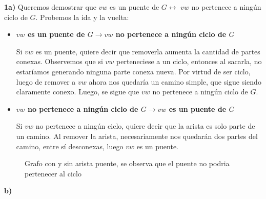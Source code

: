 \documentclass{article}
\begin{document}
\textbf{1a)} Queremos demostrar que $vw$ es un puente de $G \leftrightarrow$ $vw$ no pertenece a ningún ciclo de $G$. Probemos la ida y la vuelta:
\begin{itemize}


\item \textbf{ $vw$ es un puente de $G \rightarrow vw$ no pertenece a ningún ciclo de $G$}

Si $vw$ es un puente, quiere decir que removerla aumenta la cantidad de partes conexas. Observemos que si $vw$ perteneciese a un ciclo, entonces al sacarla, no estaríamos generando ninguna parte conexa nueva. Por virtud de ser ciclo, luego de remover a $vw$ ahora nos quedaría un camino simple, que sigue siendo claramente conexo. Luego, se sigue que $vw$ no pertenece a ningún ciclo de $G$.

\item \textbf{$vw$ no pertenece a ningún ciclo de $G \rightarrow vw$ es un puente de $G$}

Si $vw$ no pertenece a ningún ciclo, quiere decir que la arista es solo parte de un camino. Al remover la arista, necesariamente nos quedarán dos partes del camino, entre sí desconexas, luego $vw$ es un puente.
\end{itemize}
\begin{figure}[h]
    \centering
    \hspace{1cm}
    \caption{Grafo con y sin arista puente, se observa que el puente no podria pertenecer al ciclo}
\end{figure}
\textbf{b)}
\end{document}
